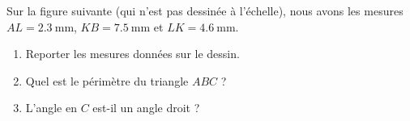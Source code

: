 
\begin{exercice}\cite{NEAPooZJNjMy}\label{exo2smath-0315}

    \begin{multicols}{2}

    Sur la figure suivante (qui n'est pas dessinée à l'échelle), nous avons les mesures \( AL=\SI{2.3}{\milli\meter}\), \( KB=\SI{7.5}{\milli\meter}\) et \( LK= \SI{4.6}{\milli\meter}\).


\begin{enumerate}
    \item
        Reporter les mesures données sur le dessin.
    \item
        Quel est le périmètre du triangle \( ABC\) ?
    \item
        L'angle en \( C\) est-il un angle droit ?
\end{enumerate}

\columnbreak

\begin{center}
                                                                            
\end{center}

    \end{multicols}

\end{exercice}
